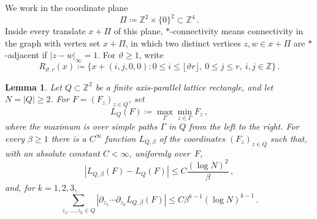 \documentclass[11pt]{amsart}
\theoremstyle{plain}
\newtheorem{lemma}[theorem]{Lemma}
\theoremstyle{definition}
\newcommand{\Z}{\mathbb{Z}}
\begin{document}
We work in the coordinate plane
\begin{equation}\label{eq:d4-coordinate-plane}
\Pi\coloneqq\Z^2\times\{0\}^2\subset\Z^4\, .
\end{equation}
Inside every translate $x+\Pi$ of this plane, $\ast$-connectivity means connectivity in the graph with vertex set $x+\Pi$, in which two distinct vertices $z,w\in x+\Pi$ are $\ast$-adjacent if $|z-w|_\infty=1$. For $\vartheta\geq1$, write
\[
	R_{\vartheta,r}(x)\coloneqq
	\{x+(i,j,0,0):0\leq i\leq\lfloor\vartheta r\rfloor,\ 0\leq j\leq r,\
	i,j\in\Z\}\, .
\]

\begin{lemma}\label{lem:d4-soft-bottleneck}
	Let $Q\subset\Z^2$ be a finite axis-parallel lattice rectangle, and let
	$N=|Q|\geq2$. For $F=(F_z)_{z\in Q}$, set
	\[
		L_Q(F)\coloneqq
		\max_{\Gamma}
		\min_{z\in\Gamma}F_z\, ,
	\]
	where the maximum is over simple paths $\Gamma$ in
	$Q$ from the left to the right. For every
	$\beta\geq1$ there is a $C^\infty$ function $L_{Q,\beta}$ of the
	coordinates $(F_z)_{z\in Q}$ such that, with an absolute constant $C<\infty$, uniformly over~$F$, 
	\begin{equation}\label{eq:d4-soft-bottleneck-approx}
		|L_{Q,\beta}(F)-L_Q(F)|
		\leq C\frac{(\log N)^2}{\beta} \, , 
	\end{equation}
	and, for $k=1,2,3$,
	\begin{equation}\label{eq:d4-soft-bottleneck-derivative}
		\sum_{z_1,\ldots,z_k\in Q}
		|\partial_{z_1}\cdots\partial_{z_k}L_{Q,\beta}(F)|
		\leq C\beta^{k-1}(\log N)^{k-1} \, . 
	\end{equation}
\end{lemma}
\end{document}
